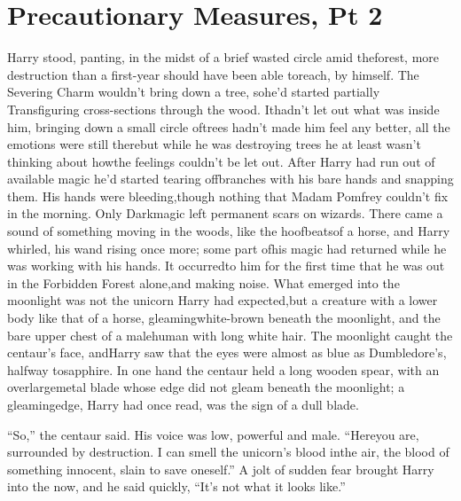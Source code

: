\chapter{Precautionary Measures, Pt 2}
Harry stood, panting, in the midst of a brief wasted circle amid theforest, more destruction than a first-year should have been able toreach, by himself. The Severing Charm wouldn't bring down a tree, sohe'd started partially Transfiguring cross-sections through the wood. Ithadn't let out what was inside him, bringing down a small circle oftrees hadn't made him feel any better, all the emotions were still therebut while he was destroying trees he at least wasn't thinking about howthe feelings couldn't be let out.
After Harry had run out of available magic he'd started tearing offbranches with his bare hands and snapping them. His hands were bleeding,though nothing that Madam Pomfrey couldn't fix in the morning. Only Darkmagic left permanent scars on wizards.
There came a sound of something moving in the woods, like the hoofbeatsof a horse, and Harry whirled, his wand rising once more; some part ofhis magic had returned while he was working with his hands. It occurredto him for the first time that he was out in the Forbidden Forest alone,and making noise.
What emerged into the moonlight was not the unicorn Harry had expected,but a creature with a lower body like that of a horse, gleamingwhite-brown beneath the moonlight, and the bare upper chest of a malehuman with long white hair. The moonlight caught the centaur's face, andHarry saw that the eyes were almost as blue as Dumbledore's, halfway tosapphire.
In one hand the centaur held a long wooden spear, with an overlargemetal blade whose edge did not gleam beneath the moonlight; a gleamingedge, Harry had once read, was the sign of a dull blade.

``So,'' the centaur said. His voice was low, powerful and male. ``Hereyou are, surrounded by destruction. I can smell the unicorn's blood inthe air, the blood of something innocent, slain to save oneself.''
A jolt of sudden fear brought Harry into the now, and he said quickly,
``It's not what it looks like.''

